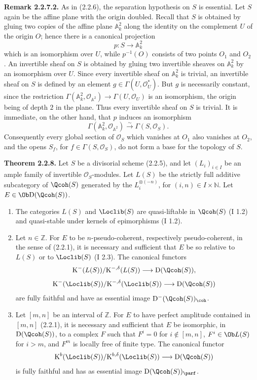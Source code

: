 \textbf{Remark 2.2.7.2.} As in (2.2.6), the separation hypothesis on $S$ is essential. Let $S$ again be the affine plane with the origin doubled. Recall that $S$ is obtained by gluing two copies of the affine plane $\mathbb A^2_k$ along the identity on the complement $U$ of the origin $O$; hence there is a canonical projection
\[
p:S\longrightarrow\mathbb A^2_k
\]
which is an isomorphism over $U$, while $p^{-1}(O)$ consists of two points $O_1$ and $O_2$. An invertible sheaf on $S$ is obtained by gluing two invertible sheaves on $\mathbb A^2_k$ by an isomorphism over $U$. Since every invertible sheaf on $\mathbb A^2_k$ is trivial, an invertible sheaf on $S$ is defined by an element $g\in\Gamma(U,\mathcal O_U^*)$. But $g$ is necessarily constant, since the restriction $\Gamma(\mathbb A^2_k,\mathcal O_{\mathbb A^2})\to\Gamma(U,\mathcal O_U)$ is an isomorphism, the origin being of depth $2$ in the plane. Thus every invertible sheaf on $S$ is trivial. It is immediate, on the other hand, that $p$ induces an isomorphism
\[
\Gamma(\mathbb A^2_k,\mathcal O_{\mathbb A^2})\xrightarrow{\sim}\Gamma(S,\mathcal O_S).
\]
Consequently every global section of $\mathcal O_S$ which vanishes at $O_1$ also vanishes at $O_2$, and the opens $S_f$, for $f\in\Gamma(S,\mathcal O_S)$, do not form a base for the topology of $S$.

\textbf{Theorem 2.2.8.} Let $S$ be a divisorial scheme (2.2.5), and let $(L_i)_{i\in I}$ be an ample family of invertible $\mathcal O_S$-modules. Let $L(S)$ be the strictly full additive subcategory of $\Qcoh(S)$ generated by the $L_i^{\otimes(-n)}$, for $(i,n)\in I\times\mathbb N$. Let $E\in\Ob\mathrm D(\Qcoh(S))$.
\begin{enumerate}[label=\alph*)]
\item The categories $L(S)$ and $\Loclib(S)$ are quasi-liftable in $\Qcoh(S)$ (I 1.2) and quasi-stable under kernels of epimorphisms (I 1.2).
\item Let $n\in\mathbb Z$. For $E$ to be $n$-pseudo-coherent, respectively pseudo-coherent, in the sense of (2.2.1), it is necessary and sufficient that $E$ be so relative to $L(S)$ or to $\Loclib(S)$ (I 2.3). The canonical functors
\[
\mathrm K^{-}(L(S))/\mathrm K^{-,\delta}(L(S))\longrightarrow \mathrm D(\Qcoh(S)),
\]
\[
\mathrm K^{-}(\Loclib(S))/\mathrm K^{-,\delta}(\Loclib(S))\longrightarrow \mathrm D(\Qcoh(S))
\]
are fully faithful and have as essential image $\mathrm D^{-}(\Qcoh(S))_{\coh}$.
\item Let $[m,n]$ be an interval of $\mathbb Z$. For $E$ to have perfect amplitude contained in $[m,n]$ (2.2.1), it is necessary and sufficient that $E$ be isomorphic, in $\mathrm D(\Qcoh(S))$, to a complex $F$ such that $F^i=0$ for $i\notin[m,n]$, $F^i\in\Ob L(S)$ for $i>m$, and $F^m$ is locally free of finite type. The canonical functor
\[
\mathrm K^b(\Loclib(S))/\mathrm K^{b,\delta}(\Loclib(S))\longrightarrow \mathrm D(\Qcoh(S))
\]
is fully faithful and has as essential image $\mathrm D(\Qcoh(S))_{\parf}$.
\end{enumerate}

